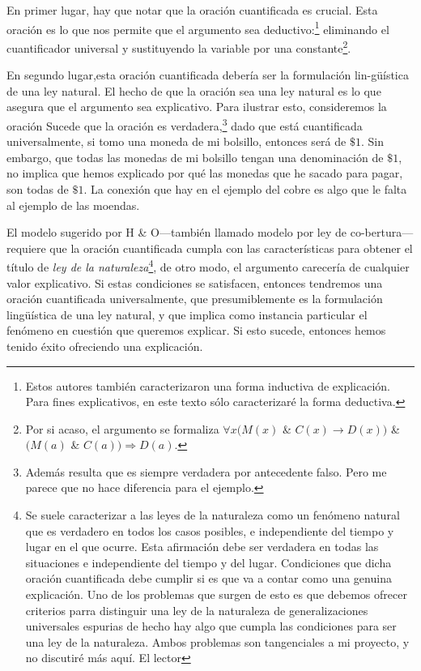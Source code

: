 En primer lugar, hay que notar que la oración cuantificada
es crucial. Esta oración es lo que nos permite que el
argumento sea deductivo:\footnote{
  Estos autores también caracterizaron una forma inductiva
  de explicación. Para fines explicativos, en este texto
  sólo caracterizaré la forma deductiva.
}
eliminando el cuantificador universal y sustituyendo la
variable por una constante\footnote{
	Por si acaso, el argumento se formaliza
  $\forall{x}(M(x)$ \& $C(x) \rightarrow
  D(x))$ \& $(M(a)$ \& $C(a))
  \Rightarrow	D(a)$.
}.

En segundo lugar,esta oración cuantificada debería ser la
formulación lin-güística de una ley natural. El hecho de que
la oración sea una ley natural es lo que asegura que el
argumento sea explicativo. Para ilustrar esto, consideremos
la oración  Sucede que la oración es verdadera,\footnote{
	Además resulta que es siempre verdadera por antecedente
	falso. Pero me parece que no hace diferencia para el
	ejemplo.
}
dado que está cuantificada  universalmente, si tomo una
moneda de mi bolsillo, entonces será de $ \$1 $. Sin
embargo, que todas las monedas de mi bolsillo tengan una
denominación de $\$1$, no implica que hemos explicado por
qué las monedas que he sacado para pagar, son todas de
$ \$1 $. La conexión que hay en el ejemplo del cobre es algo
que le falta al ejemplo de las moendas.

El modelo sugerido por H \& O---también llamado modelo por
ley de co-bertura---requiere que la oración cuantificada
cumpla con las características para obtener el título de
\emph{ley de la naturaleza}\footnote{
  Se suele caracterizar a las leyes de la naturaleza como un
  fenómeno natural que es verdadero en todos los casos
  posibles, e	independiente del tiempo y lugar en el que
  ocurre. Esta afirmación debe ser verdadera en todas las
  situaciones e independiente del tiempo y del lugar.
  Condiciones que dicha oración cuantificada debe	cumplir si
  es que va a contar como una genuina explicación. Uno de
  los problemas que surgen de esto es que debemos ofrecer
  criterios parra distinguir una ley de la naturaleza de
  generalizaciones	universales espurias
  de hecho hay algo que cumpla las condiciones para ser una
  ley de la naturaleza. Ambos problemas son tangenciales a
  mi	proyecto, y no discutiré más aquí. El lector
},
de otro modo, el argumento carecería de cualquier valor
explicativo. Si estas condiciones se satisfacen, entonces
tendremos una oración cuantificada universalmente, que
presumiblemente es la formulación lingüística de una ley
natural, y que implica como instancia particular el fenómeno
en cuestión que queremos explicar. Si esto sucede, entonces
hemos tenido éxito ofreciendo una explicación.

